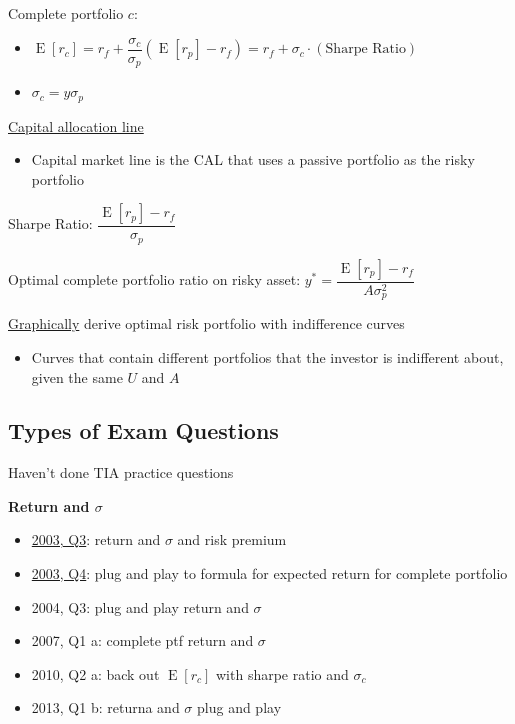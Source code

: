 \documentclass[]{book}
\providecommand{\tightlist}{%
  \setlength{\itemsep}{0pt}\setlength{\parskip}{0pt}}
\theoremstyle{definition}
\theoremstyle{definition}
\theoremstyle{remark}
\begin{document}
Complete portfolio \(c\):

\begin{itemize}
\item
  \(\operatorname{E}[r_c] = r_f + \dfrac{\sigma_c}{\sigma_p}\left( \operatorname{E}[r_p] - r_f \right) = r_f + \sigma_c \cdot (\text{Sharpe Ratio})\)
\item
  \(\sigma_c = y \sigma_p\)
\end{itemize}

\protect\hyperlink{CAL}{Capital allocation line}

\begin{itemize}
\tightlist
\item
  Capital market line is the CAL that uses a passive portfolio as the
  risky portfolio
\end{itemize}

Sharpe Ratio: \(\dfrac{\operatorname{E}[r_p] - r_f}{\sigma_p}\)

Optimal complete portfolio ratio on risky asset:
\(y^* = \dfrac{\operatorname{E}[r_p] - r_f}{A\sigma^2_p}\)

\protect\hyperlink{graphically}{Graphically} derive optimal risk
portfolio with indifference curves

\begin{itemize}
\tightlist
\item
  Curves that contain different portfolios that the investor is
  indifferent about, given the same \(U\) and \(A\)
\end{itemize}

\subsection{Types of Exam Questions}\label{types-of-exam-questions}

{Haven't done TIA practice questions}

\textbf{Return and \(\sigma\)}

\begin{itemize}
\tightlist
\item
  \protect\hyperlink{2003-3}{2003, Q3}: return and \(\sigma\) and risk
  premium
\item
  \protect\hyperlink{2003-4}{2003, Q4}: plug and play to formula for
  expected return for complete portfolio
\item
  2004, Q3: plug and play return and \(\sigma\)
\item
  2007, Q1 a: complete ptf return and \(\sigma\)
\item
  2010, Q2 a: back out \(\operatorname{E}[r_c]\) with sharpe ratio and
  \(\sigma_c\)
\item
  2013, Q1 b: returna and \(\sigma\) plug and play
\end{itemize}
\end{document}
